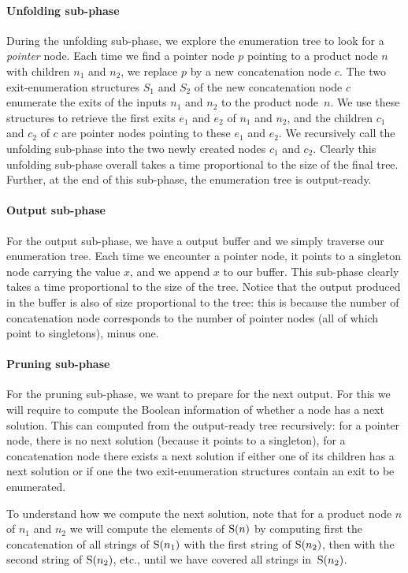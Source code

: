  \paragraph{Unfolding sub-phase}
 During the unfolding sub-phase, we explore the enumeration tree to look for
 a \emph{pointer} node. Each time we find a pointer node $p$ pointing to a
 product node $n$ with children $n_1$ and $n_2$, we replace $p$ by a new
 concatenation node $c$. The two exit-enumeration structures $S_1$ and
 $S_2$ of the new concatenation node $c$ enumerate the exits
 of the inputs $n_1$ and $n_2$ to the product node~$n$. We use these
 structures to retrieve the first exits $e_1$ and $e_2$ of $n_1$ and
 $n_2$, and the children $c_1$ and $c_2$ of $c$ are pointer nodes
 pointing to these $e_1$ and $e_2$. We recursively call the unfolding sub-phase
 into the two newly created nodes $c_1$ and $c_2$. Clearly this
 unfolding sub-phase overall takes a time proportional to the size of the final
 tree. Further, at the end of this sub-phase, the enumeration tree is
 output-ready.
 
 \paragraph{Output sub-phase}
 For the output sub-phase, we have a output buffer and we simply traverse
 our enumeration tree. Each time we encounter a pointer node, it points
 to a singleton node carrying the value $x$, and we append $x$ to our
 buffer. This sub-phase clearly takes a time proportional to the size of
 the tree. Notice that the output produced in the buffer is also of size proportional to the
 tree: this is because the number of concatenation node corresponds to the number
 of pointer nodes (all of which point to singletons), minus one.
 
 \paragraph{Pruning sub-phase}
 For the pruning sub-phase, we want to prepare for the next output. For
 this we will require to compute the Boolean information of whether a node has a
 next solution. This can computed from the output-ready tree
 recursively: for a pointer node, there is no next solution (because it
 points to a singleton), for a concatenation node there exists a next
 solution if either one of its children has a next solution or if one
 the two exit-enumeration structures contain an exit to be enumerated.
 
 To understand how we compute the next solution, note that for a
 product node $n$ of $n_1$ and $n_2$ we will compute the elements of $\mathrm{S}(n)$ by
 computing first the concatenation of all strings of $\mathrm{S}(n_1)$ with 
 the first string of $\mathrm{S}(n_2)$, then with the second string of $\mathrm{S}(n_2)$,
 etc., until we have covered all strings in~$\mathrm{S}(n_2)$.
 
